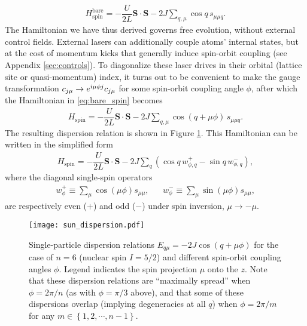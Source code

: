\documentclass[nofootinbib,notitlepage,11pt]{revtex4-2}
\renewcommand{\t}{\text} %
\newcommand{\f}[2]{\dfrac{#1}{#2}} %
\newcommand{\p}[1]{\left(#1\right)} %
\renewcommand{\set}[1]{\left\{#1\right\}} %
\renewcommand{\v}{\bm} %
\renewcommand{\c}{\cdot} %
\renewcommand{\i}{\mathrm{i}\mkern1mu} %
\newcommand{\1}{\mathds{1}}
\begin{document}
\begin{align}
  H_{\t{spin}}^{\t{bare}}
  = -\f{U}{2L} \v S \c\v S - 2J \sum_{q,\mu} \cos q\, s_{\mu\mu q}.
  \label{eq:bare_spin}
\end{align}
The Hamiltonian we have thus derived governs free evolution, without external control fields.
External lasers can additionally couple atoms' internal states, but at the cost of momentum kicks that generally induce spin-orbit coupling (see Appendix \ref{sec:controls}).
To diagonalize these laser drives in their orbital (lattice site or quasi-momentum) index, it turns out to be convenient to make the gauge transformation $c_{j\mu}\to e^{\i\mu\phi j} c_{j\mu}$ for some spin-orbit coupling angle $\phi$, after which the Hamiltonian in \eqref{eq:bare_spin} becomes
\begin{align}
  H_{\t{spin}} = -\f{U}{2L} \v S \c\v S
  - 2J \sum_{q,\mu} \cos\p{q+\mu\phi}\, s_{\mu\mu q}.
  \label{eq:spin_cos}
\end{align}
The resulting dispersion relation is shown in Figure \ref{fig:disps}.
This Hamiltonian can be written in the simplified form
\begin{align}
  H_{\t{spin}} = -\f{U}{2L} \v S\c\v S
  - 2J \sum_q \p{\cos q\, w_{\phi,q}^+ - \sin q\, w_{\phi,q}^-},
  \label{eq:spin_pair}
\end{align}
where the diagonal single-spin operators
\begin{align}
  w_\phi^+ \equiv \sum_\mu \cos\p{\mu\phi} s_{\mu\mu},
  &&
  w_\phi^- \equiv \sum_\mu \sin\p{\mu\phi} s_{\mu\mu},
\end{align}
are respectively even ($+$) and odd ($-$) under spin inversion, $\mu\to-\mu$.

\begin{figure}
  \centering
  \texttt{[image: sun\_dispersion.pdf]}
  \caption{Single-particle dispersion relations $E_{q\mu}=-2J\cos\p{q+\mu\phi}$ for the case of $n=6$ (nuclear spin $I=5/2$) and different spin-orbit coupling angles $\phi$.
    Legend indicates the spin projection $\mu$ onto the $z$.
    Note that these dispersion relations are ``maximally spread'' when $\phi=2\pi/n$ (as with $\phi=\pi/3$ above), and that some of these dispersions overlap (implying degeneracies at all $q$) when $\phi=2\pi/m$ for any $m\in\set{1,2,\cdots,n-1}$.}
  \label{fig:disps}
\end{figure}
\end{document}

